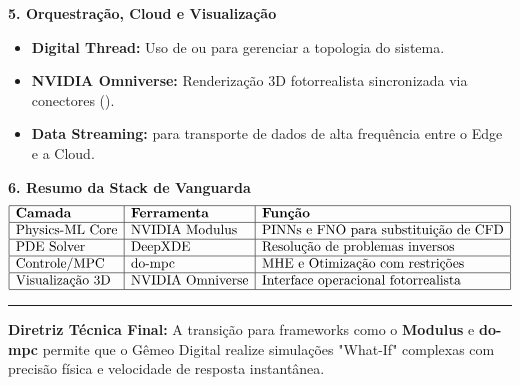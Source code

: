 \documentclass[12pt,a4paper]{article}
\numberwithin{equation}{section}
\numberwithin{table}{section}
\numberwithin{figure}{section}
\begin{document}
	\textbf{5. Orquestração, Cloud e Visualização}
	\begin{itemize}
		\item \textbf{Digital Thread:} Uso de  ou  para gerenciar a topologia do sistema.
		\item \textbf{NVIDIA Omniverse:} Renderização 3D fotorrealista sincronizada via conectores  ().
		\item \textbf{Data Streaming:}  para transporte de dados de alta frequência entre o Edge e a Cloud.
	\end{itemize}
	
	\textbf{6. Resumo da Stack de Vanguarda}
	$$
	\begin{array}{|l|l|l|}
		\hline
		\textbf{Camada} & \textbf{Ferramenta} & \textbf{Função} \\ \hline
		\text{Physics-ML Core} & \text{NVIDIA Modulus} & \text{PINNs e FNO para substituição de CFD} \\ \hline
		\text{PDE Solver} & \text{DeepXDE} & \text{Resolução de problemas inversos} \\ \hline
		\text{Controle/MPC} & \text{do-mpc} & \text{MHE e Otimização com restrições} \\ \hline
		\text{Visualização 3D} & \text{NVIDIA Omniverse} & \text{Interface operacional fotorrealista} \\ \hline
	\end{array}
	$$
	
	\vspace{1em}
	\hrule
	\vspace{1em}

	\textbf{Diretriz Técnica Final:} A transição para frameworks como o \textbf{Modulus} e \textbf{do-mpc} permite que o Gêmeo Digital realize simulações "What-If" complexas com precisão física e velocidade de resposta instantânea.
\end{document}
